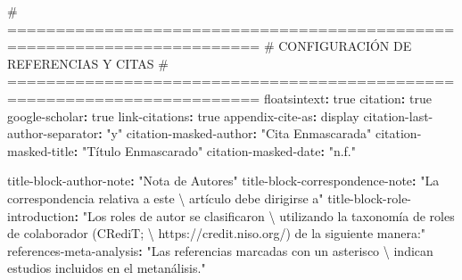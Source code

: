 \documentclass[
  doc,
  floatsintext,
  longtable,
  a4paper,
  nolmodern,
  notxfonts,
  notimes,
  12pt,
  colorlinks=true,linkcolor=blue,citecolor=blue,urlcolor=blue]{apa7}
\newenvironment{Shaded}{\begin{snugshade}}{\end{snugshade}}
\newcommand{\AttributeTok}[1]{\textcolor[rgb]{0.40,0.45,0.13}{#1}}
\newcommand{\CharTok}[1]{\textcolor[rgb]{0.13,0.47,0.30}{#1}}
\newcommand{\CommentTok}[1]{\textcolor[rgb]{0.37,0.37,0.37}{#1}}
\newcommand{\FunctionTok}[1]{\textcolor[rgb]{0.28,0.35,0.67}{#1}}
\newcommand{\KeywordTok}[1]{\textcolor[rgb]{0.00,0.23,0.31}{\textbf{#1}}}
\newcommand{\SpecialCharTok}[1]{\textcolor[rgb]{0.37,0.37,0.37}{#1}}
\newcommand{\StringTok}[1]{\textcolor[rgb]{0.13,0.47,0.30}{#1}}
\begin{document}
\begin{Shaded}
\begin{Highlighting}[]
\CommentTok{\# ========================================================================}
\CommentTok{\# CONFIGURACIÓN DE REFERENCIAS Y CITAS}
\CommentTok{\# ========================================================================}
\FunctionTok{floatsintext}\KeywordTok{:}\AttributeTok{ }\CharTok{true}
\FunctionTok{citation}\KeywordTok{:}\AttributeTok{ }\CharTok{true}
\FunctionTok{google{-}scholar}\KeywordTok{:}\AttributeTok{ }\CharTok{true}
\FunctionTok{link{-}citations}\KeywordTok{:}\AttributeTok{ }\CharTok{true}
\FunctionTok{appendix{-}cite{-}as}\KeywordTok{:}\AttributeTok{ display}
\FunctionTok{citation{-}last{-}author{-}separator}\KeywordTok{:}\AttributeTok{ }\StringTok{"y"}
\FunctionTok{citation{-}masked{-}author}\KeywordTok{:}\AttributeTok{ }\StringTok{"Cita Enmascarada"}
\FunctionTok{citation{-}masked{-}title}\KeywordTok{:}\AttributeTok{ }\StringTok{"Título Enmascarado"}
\FunctionTok{citation{-}masked{-}date}\KeywordTok{:}\AttributeTok{ }\StringTok{"n.f."}

\FunctionTok{title{-}block{-}author{-}note}\KeywordTok{:}\AttributeTok{ }\StringTok{"Nota de Autores"}
\FunctionTok{title{-}block{-}correspondence{-}note}\KeywordTok{:}\AttributeTok{ }\StringTok{"La correspondencia relativa a este  }\SpecialCharTok{\textbackslash{} }
\StringTok{artículo debe dirigirse a"}
\FunctionTok{title{-}block{-}role{-}introduction}\KeywordTok{:}\AttributeTok{ }\StringTok{"Los roles de autor se clasificaron    }\SpecialCharTok{\textbackslash{} }
\StringTok{utilizando la taxonomía de roles de colaborador (CRediT;  }\SpecialCharTok{\textbackslash{} }
\StringTok{https://credit.niso.org/) de la siguiente manera:"}
\FunctionTok{references{-}meta{-}analysis}\KeywordTok{:}\AttributeTok{ }\StringTok{"Las referencias marcadas con un asterisco  }\SpecialCharTok{\textbackslash{} }
\StringTok{indican estudios incluidos en el metanálisis."}


\end{Highlighting}
\end{Shaded}
\end{document}
